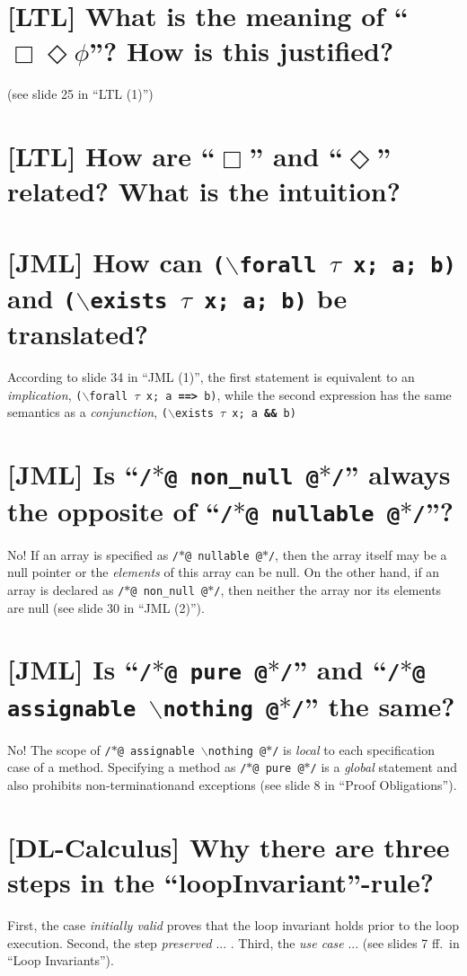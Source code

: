 \section{[LTL] What is the meaning of ``$\Box\Diamond\phi$''? How is this justified?}
(see slide 25 in ``LTL (1)'')

\section{[LTL] How are ``$\Box$'' and ``$\Diamond$'' related? What is the intuition?}

\section{[JML] How can \texttt{($\backslash$forall $\tau$ x; a; b)} and \texttt{($\backslash$exists $\tau$ x; a; b)} be translated?}
According to slide 34 in ``JML (1)'', the first statement is equivalent to an \emph{implication}, \texttt{($\backslash$forall $\tau$ x; a {\bf==>} b)}, while the second expression has the same semantics as a \emph{conjunction}, \texttt{($\backslash$exists $\tau$ x; a {\bf\&\&} b)}

\section{[JML] Is ``\texttt{/$*$@ non\_null @$*$/}'' always the opposite of ``\texttt{/$*$@ nullable @$*$/}''?}
No! If an array is specified as \texttt{/$*$@ nullable @$*$/}, then the array itself may be a null pointer or the \emph{elements} of this array can be null. On the other hand, if an array is declared as \texttt{/$*$@ non\_null @$*$/}, then neither the array nor its elements are null (see slide 30 in ``JML (2)'').

\section{[JML] Is ``\texttt{/$*$@ pure @$*$/}'' and ``\texttt{/$*$@ assignable $\backslash$nothing @$*$/}'' the same?}
No! The scope of \texttt{/$*$@ assignable $\backslash$nothing @$*$/} is \emph{local} to each specification case of a method. Specifying a method as \texttt{/$*$@ pure @$*$/} is a \emph{global} statement and also prohibits non-terminationand exceptions (see slide 8 in ``Proof Obligations'').

\section{[DL-Calculus] Why there are three steps in the ``\textsf{loopInvariant}''-rule?}
First, the case \emph{initially valid} proves that the loop invariant holds prior to the loop execution. Second, the step \emph{preserved} ... . Third, the \emph{use case} ... (see slides 7 ff.\ in ``Loop Invariants'').